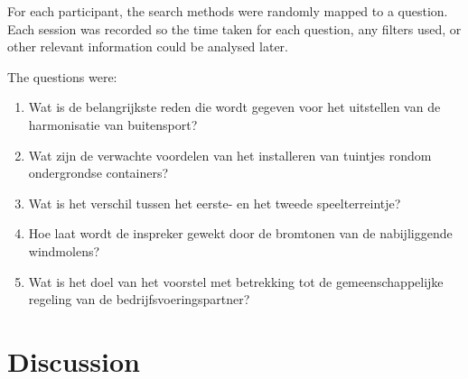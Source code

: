 \documentclass[twoside]{uva-inf-bachelor-thesis}
\begin{document}
For each participant, the search methods were randomly mapped to a question. 
Each session was recorded so the time taken for each question, any filters used, or other relevant information could be analysed later.

The questions were:
\begin{enumerate}
    \item Wat is de belangrijkste reden die wordt gegeven voor het uitstellen van de harmonisatie van buitensport?
    \item Wat zijn de verwachte voordelen van het installeren van tuintjes rondom ondergrondse containers?
    \item Wat is het verschil tussen het eerste- en het tweede speelterreintje?
    \item Hoe laat wordt de inspreker gewekt door de bromtonen van de nabijliggende windmolens?
    \item Wat is het doel van het voorstel met betrekking tot de gemeenschappelijke regeling van de bedrijfsvoeringspartner?
\end{enumerate}


\chapter{Discussion}



\printbibliography
\end{document}
